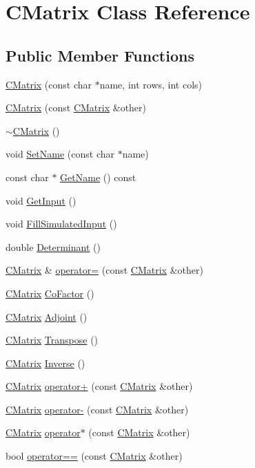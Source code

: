 \hypertarget{classCMatrix}{}\section{C\+Matrix Class Reference}
\label{classCMatrix}
\subsection*{Public Member Functions}
\begin{DoxyCompactItemize}
\item 
\hyperlink{classCMatrix_a768f915421b966dfe28fe346ba262ce7}{C\+Matrix} (const char $\ast$name, int rows, int cols)
\item 
\hyperlink{classCMatrix_a81e958550021cc7a00fda22a46c774f3}{C\+Matrix} (const \hyperlink{classCMatrix}{C\+Matrix} \&other)
\item 
\hyperlink{classCMatrix_aff1a3524e09b0329286c5e231c3f1afb}{$\sim$\+C\+Matrix} ()
\item 
void \hyperlink{classCMatrix_a7878287aa7b5a1404980ff08d3cfeb16}{Set\+Name} (const char $\ast$name)
\item 
const char $\ast$ \hyperlink{classCMatrix_ae6df44c34368fbad7a5bfbda879af3ee}{Get\+Name} () const 
\item 
void \hyperlink{classCMatrix_af90c46bd02b2a57c58ffcff64d8dd3c6}{Get\+Input} ()
\item 
void \hyperlink{classCMatrix_afd8bcbf3b820b37223886632251e4d55}{Fill\+Simulated\+Input} ()
\item 
double \hyperlink{classCMatrix_a865ff8f610be372e666fbf24d5b73a3a}{Determinant} ()
\item 
\hyperlink{classCMatrix}{C\+Matrix} \& \hyperlink{classCMatrix_a939d852e81803eddaac29d96d0a1ef84}{operator=} (const \hyperlink{classCMatrix}{C\+Matrix} \&other)
\item 
\hyperlink{classCMatrix}{C\+Matrix} \hyperlink{classCMatrix_acc5e18f7dac42418762e92ebd8d10840}{Co\+Factor} ()
\item 
\hyperlink{classCMatrix}{C\+Matrix} \hyperlink{classCMatrix_a029eef7850029d78359ba09607cd8457}{Adjoint} ()
\item 
\hyperlink{classCMatrix}{C\+Matrix} \hyperlink{classCMatrix_ab8e853a7df8e23889ab233523324ff29}{Transpose} ()
\item 
\hyperlink{classCMatrix}{C\+Matrix} \hyperlink{classCMatrix_abd58298df23c98b8675a81a70c6f140b}{Inverse} ()
\item 
\hyperlink{classCMatrix}{C\+Matrix} \hyperlink{classCMatrix_a0fac0198450dcbcd402e1802dd6b8008}{operator+} (const \hyperlink{classCMatrix}{C\+Matrix} \&other)
\item 
\hyperlink{classCMatrix}{C\+Matrix} \hyperlink{classCMatrix_a26d893cfb384a7c23f5c2c959fe74293}{operator-\/} (const \hyperlink{classCMatrix}{C\+Matrix} \&other)
\item 
\hyperlink{classCMatrix}{C\+Matrix} \hyperlink{classCMatrix_a665fdcc1fda1a9a23e6128f1ec31cc69}{operator$\ast$} (const \hyperlink{classCMatrix}{C\+Matrix} \&other)
\item 
bool \hyperlink{classCMatrix_a2f26b64fa654512fe2a4e954f18e1f1c}{operator==} (const \hyperlink{classCMatrix}{C\+Matrix} \&other)
\end{DoxyCompactItemize}
